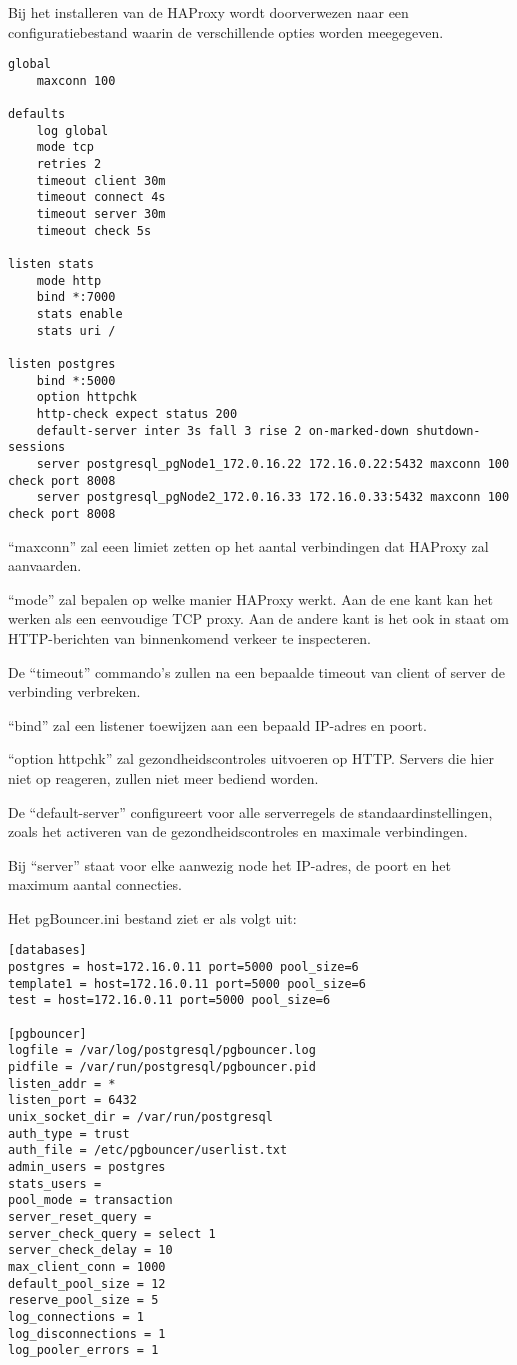 
Bij het installeren van de HAProxy wordt doorverwezen naar een configuratiebestand waarin de verschillende opties worden meegegeven.

\begin{lstlisting}
global
    maxconn 100

defaults
    log global
    mode tcp
    retries 2
    timeout client 30m
    timeout connect 4s
    timeout server 30m
    timeout check 5s

listen stats
    mode http
    bind *:7000
    stats enable
    stats uri /

listen postgres
    bind *:5000
    option httpchk
    http-check expect status 200
    default-server inter 3s fall 3 rise 2 on-marked-down shutdown-sessions
    server postgresql_pgNode1_172.0.16.22 172.16.0.22:5432 maxconn 100 check port 8008
    server postgresql_pgNode2_172.0.16.33 172.16.0.33:5432 maxconn 100 check port 8008
\end{lstlisting}

“maxconn” zal eeen limiet zetten op het aantal verbindingen dat HAProxy zal aanvaarden.

“mode” zal bepalen op welke manier HAProxy werkt. Aan de ene kant kan het werken als een eenvoudige TCP proxy. Aan de andere kant is het ook in staat om HTTP-berichten van binnenkomend verkeer te inspecteren.

De “timeout” commando's zullen na een bepaalde timeout van client of server de verbinding verbreken.

“bind” zal een listener toewijzen aan een bepaald IP-adres en poort.

“option httpchk” zal gezondheidscontroles uitvoeren op HTTP. Servers die hier niet op reageren, zullen niet meer bediend worden.

De “default-server” configureert voor alle serverregels de standaardinstellingen, zoals het activeren van de gezondheidscontroles en maximale verbindingen.

Bij “server” staat voor elke aanwezig node het IP-adres, de poort en het maximum aantal connecties.



Het pgBouncer.ini bestand ziet er als volgt uit:

\begin{lstlisting}
[databases]
postgres = host=172.16.0.11 port=5000 pool_size=6
template1 = host=172.16.0.11 port=5000 pool_size=6
test = host=172.16.0.11 port=5000 pool_size=6

[pgbouncer]
logfile = /var/log/postgresql/pgbouncer.log
pidfile = /var/run/postgresql/pgbouncer.pid
listen_addr = *
listen_port = 6432
unix_socket_dir = /var/run/postgresql
auth_type = trust
auth_file = /etc/pgbouncer/userlist.txt
admin_users = postgres
stats_users =
pool_mode = transaction
server_reset_query =
server_check_query = select 1
server_check_delay = 10
max_client_conn = 1000
default_pool_size = 12
reserve_pool_size = 5
log_connections = 1
log_disconnections = 1
log_pooler_errors = 1  
\end{lstlisting}

